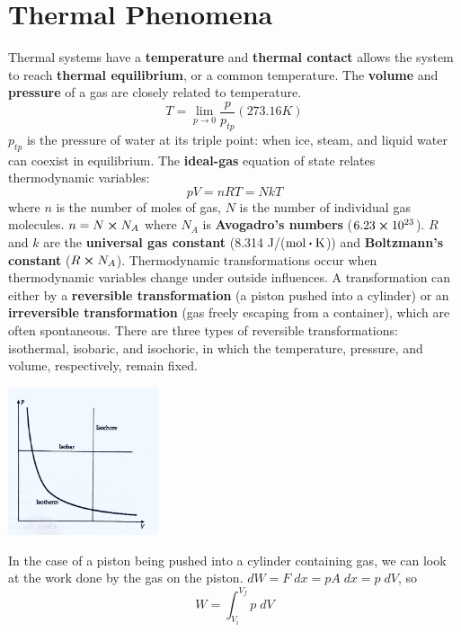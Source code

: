 \section{Thermal Phenomena}
    Thermal systems have a \textbf{temperature} and \textbf{thermal contact} allows the system to reach \textbf{thermal equilibrium}, or a common temperature. The \textbf{volume} and \textbf{pressure} of a gas are closely related to temperature.
    \begin{equation*}
        T = \lim_{p \to 0} \frac{p}{p_{tp}}(273.16 K)
    \end{equation*}
    $p_{tp}$ is the pressure of water at its triple point: when ice, steam, and liquid water can coexist in equilibrium. The \textbf{ideal-gas} equation of state relates thermodynamic variables:
    \begin{equation*}
        pV = nRT = NkT
    \end{equation*}
    where $n$ is the number of moles of gas, $N$ is the number of individual gas molecules. $n = N \cross N_A$ where $N_A$ is \textbf{Avogadro's numbers} ($6.23 \cross 10^{23}$). $R$ and $k$ are the \textbf{universal gas constant} (8.314 J/($\text{mol} \vdot \text{K}$)) and \textbf{Boltzmann's constant} ($R \cross N_A$).
    \newline \indent
    Thermodynamic transformations occur when thermodynamic variables change under outside influences. A transformation can either by a \textbf{reversible transformation} (a piston pushed into a cylinder) or an \textbf{irreversible transformation} (gas freely escaping from a container), which are often spontaneous. There are three types of reversible transformations: isothermal, isobaric, and isochoric, in which the temperature, pressure, and volume, respectively, remain fixed.
    \begin{center}
        \includegraphics[width=125pt]{pvdiagram.jpg}
    \end{center}
    In the case of a piston being pushed into a cylinder containing gas, we can look at the work done by the gas on the piston. $dW = F\;dx = pA\;dx = p\;dV$, so 
    \begin{equation*}
        W = \int_{V_i}^{V_f}p\;dV
    \end{equation*}
